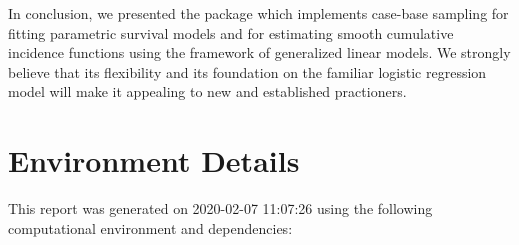 \documentclass[
]{jss}
\begin{document}
In conclusion, we presented the  package 
which implements case-base sampling for fitting parametric survival
models and for estimating smooth cumulative incidence functions using
the framework of generalized linear models. We strongly believe that its
flexibility and its foundation on the familiar logistic regression model
will make it appealing to new and established practioners.

\hypertarget{environment-details}{%
\section{Environment Details}\label{environment-details}}

This report was generated on 2020-02-07 11:07:26 using the following
computational environment and dependencies:
\end{document}
